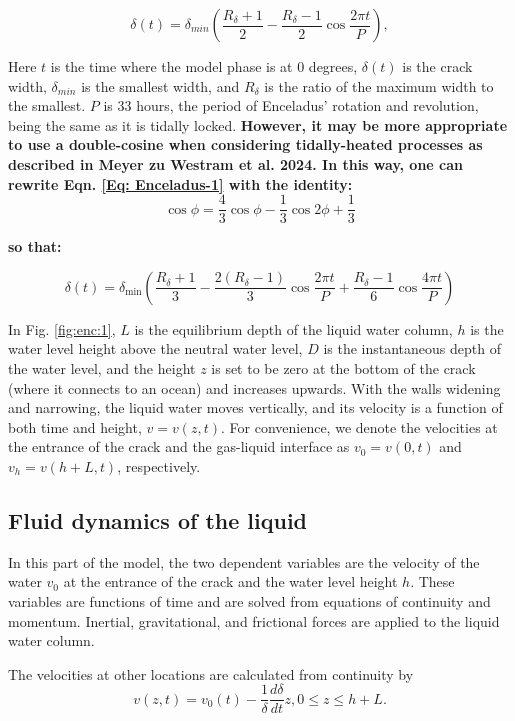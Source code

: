 \documentclass[draft]{agujournal2019}
\begin{document}
\begin{refsection}
\begin{equation}
    \delta(t)=\delta_{min}\left(\frac{R_\delta+1}{2}-\frac{R_\delta-1}{2}\cos\frac{2\pi t}{P}\right)
    \label{Eq: Enceladus-1},
\end{equation}

Here $t$ is the time where the model phase is at 0 degrees, $\delta(t)$ is the crack width, $\delta_{min}$ is the smallest width, and $R_\delta$ is the ratio of the maximum width to the smallest. $P$ is 33 hours, the period of Enceladus' rotation and revolution, being the same as it is tidally locked.
\textbf{However, it may be more appropriate to use a double-cosine when considering tidally-heated processes as described in \citet{MeyerZuWestram2024} Meyer zu Westram et al. 2024. In this way, one can rewrite Eqn. \ref{Eq: Enceladus-1} with the identity:} \[
\cos\phi = \frac{4}{3}\cos\phi - \frac{1}{3}\cos 2\phi + \frac{1}{3}
\]

\textbf{so that: }

\begin{equation}
\delta(t) = \delta_{\min} \left( \frac{R_\delta + 1}{3} - \frac{2(R_\delta-1)}{3} \cos\frac{2\pi t}{P} + \frac{R_\delta-1}{6} \cos\frac{4\pi t}{P} \right)
\end{equation}




In Fig. \ref{fig:enc:1}, $L$ is the equilibrium depth of the liquid water column, $h$ is the water level height above the neutral water level, $D$ is the instantaneous depth of the water level, and the height $z$ is set to be zero at the bottom of the crack (where it connects to an ocean) and increases upwards. With the walls widening and narrowing, the liquid water moves vertically, and its velocity is a function of both time and height, $v=v(z,t)$. For convenience, we denote the velocities at the entrance of the crack and the gas-liquid interface as $v_0=v(0,t)$ and $v_h=v(h+L,t)$, respectively.

\subsection{Fluid dynamics of the liquid}
In this part of the model, the two dependent variables are the velocity of the water $v_0$ at the entrance of the crack and the water level height $h$. These variables are functions of time and are solved from equations of continuity and momentum. Inertial, gravitational, and frictional forces are applied to the liquid water column.

The velocities at other locations are calculated from continuity by
\begin{equation}
    v(z,t)=v_0(t)-\frac{1}{\delta}\frac{d\delta}{dt}z, 0\leq z \leq h+L.
    \label{Eq: Enceladus-2}
\end{equation}


\end{refsection}
\end{document}
